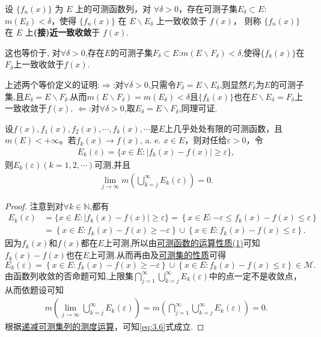 \documentclass[../../main.tex]{subfiles}%
\begin{document}
\begin{definition}[(接)近一致收敛]
设 $\{f_n(x)\}$ 为 $E$ 上的可测函数列，对 $\forall\delta > 0$，存在可测子集$E_\delta\subset E$:$m(E_\delta) < \delta$，使得 $\{f_n(x)\}$ 在 $E\backslash E_\delta$ 上一致收敛于 $f(x)$，
则称 $\{f_n(x)\}$ 在 $E$ 上\textbf{(接)近一致收敛}于 $f(x)$. 

这也等价于,
对$\forall \delta >0$,存在$E$的可测子集$F_\delta\subset E$:$m(E\backslash F_\delta)<\delta$,使得$\{f_k(x)\}$在$F_\delta$上一致收敛于$f(x)$.
\end{definition}
\begin{remark}
上述两个等价定义的证明:$\Rightarrow$:对$\forall \delta >0$,只需令$F_\delta=E\backslash E_\delta$,则显然$F_\delta$为$E$的可测子集,且$E_\delta=E\backslash F_\delta$.从而$m(E\backslash F_\delta)=m(E_\delta)<\delta$且$\{f_k(x)\}$也在$E\backslash E_\delta=F_\delta$上一致收敛于$f(x)$.
$\Leftarrow$:对$\forall \delta >0$,取$E_\delta=E\backslash F_\delta$,同理可证.
\end{remark}

\begin{lemma}\label{lemma:引理3.11}
设$f(x), f_1(x), f_2(x), \cdots, f_k(x), \cdots$是$E$上几乎处处有限的可测函数，且$m(E) < +\infty$。若$f_k(x) \to f(x)$, a. e. $x \in E$，则对任给$\varepsilon > 0$，令
\begin{align*}
E_k(\varepsilon) = \{x \in E: |f_k(x) - f(x)| \geqslant \varepsilon\},
\end{align*}
则$E_k(\varepsilon)(k=1,2,\cdots)$可测,并且
\begin{align}
\lim_{j \to \infty} m\left( \bigcup_{k = j}^{\infty} E_k(\varepsilon) \right) = 0. \label{eq:3.6}
\end{align}
\end{lemma}
\begin{proof}

注意到对$\forall k\in \mathbb{N}$,都有
\begin{align*}
E_k(\varepsilon )&=\{x\in E:|f_k(x)-f(x)|\geqslant \varepsilon \}=\left\{ x\in E:-\varepsilon \leqslant f_k(x)-f(x)\leqslant \varepsilon \right\} 
\\
&=\left\{ x\in E:f_k(x)-f(x)\geqslant -\varepsilon \right\} \cup \left\{ x\in E:f_k(x)-f(x)\leqslant \varepsilon \right\} .
\end{align*}
因为$f_k(x)$和$f(x)$都在$E$上可测,所以由\hyperref[theorem:可测函数的运算性质]{可测函数的运算性质(1)}可知$f_k(x)-f(x)$也在$E$上可测.从而再由及\hyperref[theorem:可测集的性质]{可测集的性质}可得
\[
E_k(\varepsilon)=\left\{ x\in E:f_k(x)-f(x)\geqslant -\varepsilon \right\} \cup \left\{ x\in E:f_k(x)-f(x)\leqslant \varepsilon \right\}\in \mathscr{M}.
\]
由函数列收敛的否命题可知,上限集$\bigcap_{j = 1}^{\infty} \bigcup_{k = j}^{\infty} E_k(\varepsilon)$中的点一定不是收敛点，从而依题设可知
\begin{align*}
m\left( \lim_{j \to \infty}\bigcup_{k = j}^{\infty} E_k(\varepsilon) \right)=m\left( \bigcap_{j = 1}^{\infty} \bigcup_{k = j}^{\infty} E_k(\varepsilon) \right) = 0.
\end{align*}
根据\hyperref[corollary:递减可测集列的测度运算]{递减可测集列的测度运算}，可知\eqref{eq:3.6}式成立.

\end{proof}
\end{document}
